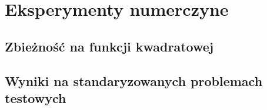 \section{Eksperymenty numerczyne}
\subsection{Zbieżność na funkcji kwadratowej}
\subsection{Wyniki na standaryzowanych problemach testowych}
